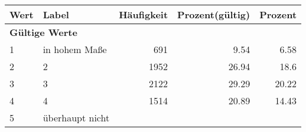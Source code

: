      \begin{longtable}{lXrrr}
     \toprule
     \textbf{Wert} & \textbf{Label} & \textbf{Häufigkeit} & \textbf{Prozent(gültig)} & \textbf{Prozent} \\
     \endhead
     \midrule
     \multicolumn{5}{l}{\textbf{Gültige Werte}}\\

     1 &
     \multicolumn{1}{X}{ in hohem Maße   } &


       \num{691} &
       \num[round-mode=places,round-precision=2]{9.54} &
         \num[round-mode=places,round-precision=2]{6.58} \\

     2 &
     \multicolumn{1}{X}{ 2   } &


       \num{1952} &
       \num[round-mode=places,round-precision=2]{26.94} &
         \num[round-mode=places,round-precision=2]{18.6} \\

     3 &
     \multicolumn{1}{X}{ 3   } &


       \num{2122} &
       \num[round-mode=places,round-precision=2]{29.29} &
         \num[round-mode=places,round-precision=2]{20.22} \\

     4 &
     \multicolumn{1}{X}{ 4   } &


       \num{1514} &
       \num[round-mode=places,round-precision=2]{20.89} &
         \num[round-mode=places,round-precision=2]{14.43} \\

     5 &
     \multicolumn{1}{X}{ überhaupt nicht   } &



\end{longtable}
